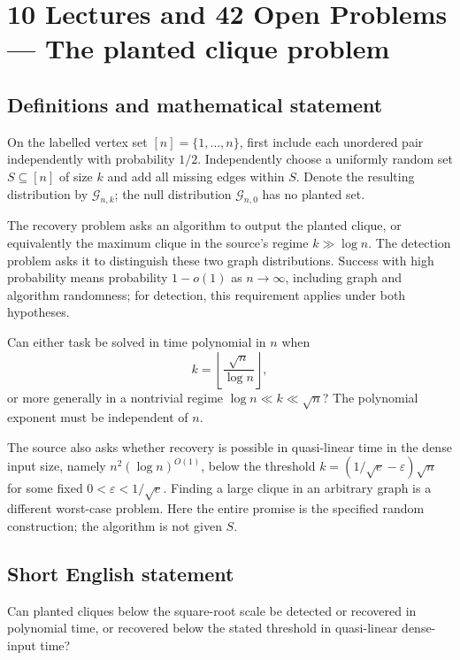 \documentclass[11pt,a4paper]{article}
\begin{document}
\section*{10 Lectures and 42 Open Problems — The planted clique problem}\label{statement}

\subsection{Definitions and mathematical statement}
On the labelled vertex set $[n]=\{1,\ldots,n\}$, first include each
unordered pair independently with probability $1/2$. Independently choose
a uniformly random set $S\subseteq[n]$ of size $k$ and add all missing
edges within $S$. Denote the resulting distribution by $\mathcal G_{n,k}$;
the null distribution $\mathcal G_{n,0}$ has no planted set.

The recovery problem asks an algorithm to output the planted clique,
or equivalently the maximum clique in the source's regime
$k\gg\log n$. The detection problem asks it to distinguish these two
graph distributions. Success with high probability means probability
$1-o(1)$ as $n\to\infty$, including graph and algorithm randomness;
for detection, this requirement applies under both hypotheses.

Can either task be solved in time polynomial in $n$ when
\[
                 k=\left\lfloor\frac{\sqrt n}{\log n}\right\rfloor,
\]
or more generally in a nontrivial regime $\log n\ll k\ll\sqrt n$?
The polynomial exponent must be independent of $n$.

The source also asks whether recovery is possible in quasi-linear time
in the dense input size, namely $n^2(\log n)^{O(1)}$, below the threshold
$k=(1/\sqrt e-\varepsilon)\sqrt n$ for some fixed
$0<\varepsilon<1/\sqrt e$. Finding a large clique in an arbitrary graph
is a different worst-case problem. Here the entire promise is the
specified random construction; the algorithm is not given $S$.
\subsection{Short English statement}
Can planted cliques below the square-root scale be detected or recovered in polynomial time, or recovered below the stated threshold in quasi-linear dense-input time?
\end{document}
